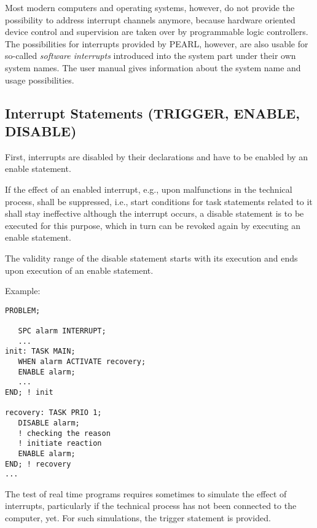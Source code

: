 Most modern computers and operating systems, however, do not provide the
possibility to address interrupt channels anymore, because hardware
oriented device control and supervision are taken over by programmable
logic controllers. The possibilities for interrupts provided by PEARL,
however, are also usable for so-called {\em software interrupts}
introduced into the system part under their own system names. The user manual
gives information about the system name and usage possibilities.

\subsection{Interrupt Statements (TRIGGER, ENABLE, DISABLE)}    %
\label{sec_task_interrupt}

First, interrupts are disabled by their declarations and have to be
enabled by an enable statement.

If the effect of an enabled interrupt, e.g., upon malfunctions in the
technical process, shall be suppressed, i.e., start conditions for task
statements related to it shall stay ineffective although the interrupt
occurs, a disable statement is to be executed for this purpose, which
in turn can be revoked again by executing an enable statement.

\begin{grammarframe}

\end{grammarframe}

The validity range of the disable statement starts with its
execution and ends upon execution of an enable statement.

Example:

\begin{lstlisting}
PROBLEM;

   SPC alarm INTERRUPT;
   ...
init: TASK MAIN;
   WHEN alarm ACTIVATE recovery;
   ENABLE alarm;
   ... 
END; ! init

recovery: TASK PRIO 1;
   DISABLE alarm;
   ! checking the reason
   ! initiate reaction
   ENABLE alarm;
END; ! recovery
...
\end{lstlisting}

The test of real time programs requires sometimes to simulate the effect
of interrupts, particularly if the technical process has not been
connected to the computer, yet. For such simulations, the trigger
statement is provided.


